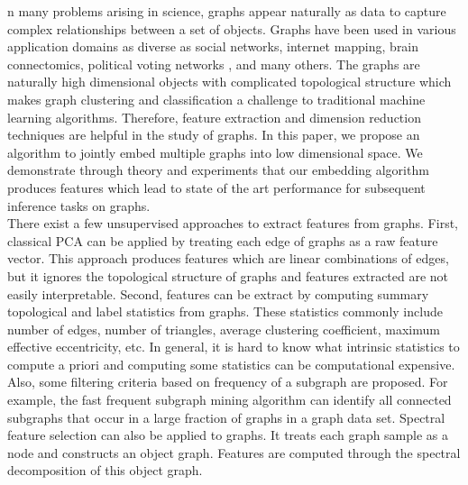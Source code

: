 \documentclass[10pt,journal,compsoc]{IEEEtran}
\begin{document}
\noindent {}n many problems arising in science, graphs appear naturally as data to capture complex relationships between a set of objects. Graphs have been used in various application domains as diverse as social networks\cite{otte2002social}, internet mapping\cite{govindan2000heuristics}, brain connectomics\cite{bullmore2011brain}, political voting networks \cite{ward2011network},  and many others. The graphs are naturally high dimensional objects with complicated topological structure which makes graph clustering and classification a challenge to traditional machine learning algorithms. Therefore, feature extraction and dimension reduction techniques are helpful in the study of graphs. In this paper, we propose an algorithm to jointly embed multiple graphs into low dimensional space. We demonstrate through theory and experiments that our embedding algorithm produces features which lead to state of the art performance for subsequent inference tasks on graphs.  \\

\noindent There exist a few unsupervised approaches to extract features from graphs. First, classical PCA can be applied by treating each edge of graphs as a raw feature vector\cite{jolliffe2002principal}. This approach produces features which are linear combinations of edges, but it ignores the topological structure of graphs and features extracted are not easily interpretable. Second, features can be extract by computing summary topological and label statistics from graphs\cite{li2011graph}. These statistics commonly include number of edges, number of triangles, average clustering coefficient, maximum effective eccentricity, etc. In general, it is hard to know what intrinsic statistics to compute a priori and computing some statistics can be computational expensive. Also, some filtering criteria based on frequency of a subgraph are proposed. For example, the fast frequent subgraph mining algorithm can identify all connected subgraphs that occur in a large fraction of graphs in a graph data set\cite{huan2003efficient}. Spectral feature selection can also be applied to graphs. It treats each graph sample as a node and constructs an object graph. Features are computed through the spectral decomposition of this object graph\cite{zhao2007spectral}. \\
\end{document}
